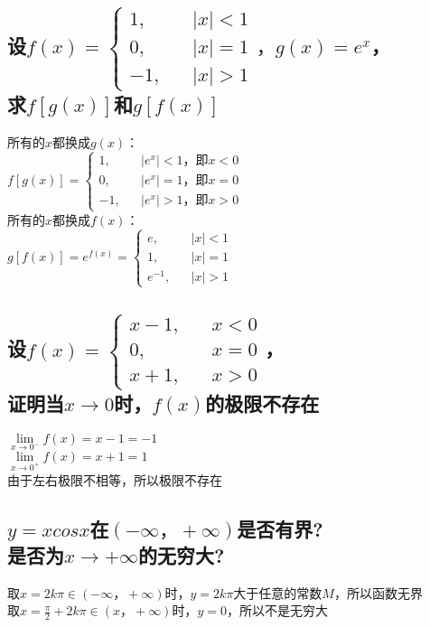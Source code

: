 \documentclass{article}
\begin{document}
\begin{flushleft}
	\subsection{
	设$f(x)=\left\{
	\begin{array}{rcl}
	1,& & |x|<1\\
	0,& & |x|=1\\
	-1,& & |x|>1
	\end{array} \right.，g(x)=e^x$，\\
	求$f[g(x)]$和$g[f(x)]$
	}
	所有的$x$都换成$g(x)$：\\
	$f[g(x)]=\left\{
	\begin{array}{rcl}
	1,& & |e^x|<1，\mbox{即}x<0\\
	0,& & |e^x|=1，\mbox{即}x=0\\
	-1,& & |e^x|>1，\mbox{即}x>0
	\end{array} \right.$\\
	所有的$x$都换成$f(x)$：\\
	$g[f(x)]=e^{f(x)}=\left\{
	\begin{array}{rcl}
	e,& & |x|<1\\
	1,& & |x|=1\\
	e^{-1},& & |x|>1
	\end{array} \right.$\\
	
	\subsection{
	设$f(x)=\left\{
	\begin{array}{rcl}
	x-1,& & x<0\\
	0,& & x=0\\
	x+1,& & x>0
	\end{array} \right.$，\\
	证明当$x\to 0$时，$f(x)$的极限不存在
	}
	$\lim\limits_{x\to 0^-}f(x)=x-1=-1$\\
	$\lim\limits_{x\to 0^+}f(x)=x+1=1$\\
	由于左右极限不相等，所以极限不存在\\
	
	\subsection{
	$y=xcosx$在$(-\infty，+\infty)$是否有界?\\
	是否为$x\to +\infty$的无穷大?
	}
	取$x=2k\pi\in(-\infty，+\infty)$时，$y=2k\pi$大于任意的常数$M$，所以函数无界\\
	取$x=\frac{\pi}{2}+2k\pi\in(x，+\infty)$时，$y=0$，所以不是无穷大\\
	

\end{flushleft}
\end{document}
